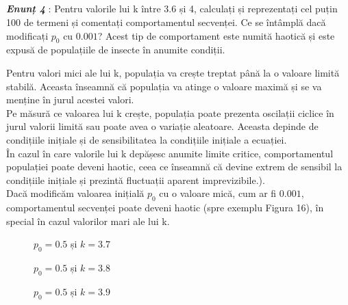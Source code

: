 \documentclass[a4paper,12pt]{article}
\begin{document}
\textit{\textbf{\\\\\\\\Enunț 4}} : Pentru valorile lui k între $3.6$ și 4, calculați și reprezentați cel puțin 100 de termeni și comentați comportamentul secvenței. Ce se întâmplă dacă modificați $p_0$ cu $0.001$? Acest tip de comportament este numită haotică și este expusă de populațiile de insecte în anumite condiții.


Pentru valori mici ale lui k, populația va crește treptat până la o valoare limită stabilă. Aceasta înseamnă că populația va atinge o valoare maximă și se va menține în jurul acestei valori.\\
Pe măsură ce valoarea lui k crește, populația poate prezenta oscilații ciclice în jurul valorii limită sau poate avea o variație aleatoare. Aceasta depinde de condițiile inițiale și de sensibilitatea la condițiile inițiale a ecuației.\\
În cazul în care valorile lui k depășesc anumite limite critice, comportamentul populației poate deveni haotic, ceea ce înseamnă că devine extrem de sensibil la condițiile inițiale și prezintă fluctuații aparent imprevizibile.).\\
Dacă modificăm valoarea inițială $p_0$ cu o valoare mică, cum ar fi $0.001$, comportamentul secvenței poate deveni haotic (spre exemplu Figura 16), în special în cazul valorilor mari ale lui k.\\


\begin{figure}[h!]
\centering
{}
\caption{$p_0 = 0.5$ și $k=3.7$}
\end{figure}


\begin{figure}[h!]
\centering
{}
\caption{$p_0 = 0.5$ și $k=3.8$}
\end{figure}


\begin{figure}[h!]
\centering
{}
\caption{$p_0 = 0.5$ și $k=3.9$}
\end{figure}
\end{document}
